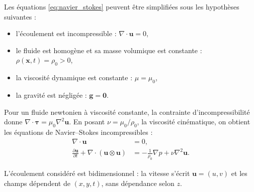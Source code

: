 Les équations \eqref{eq:navier_stokes} peuvent être simplifiées sous les
hypothèses suivantes :
\begin{itemize}
    \item l'écoulement est incompressible :
    $\nabla \cdot \mathbf{u} = 0$,

    \item le fluide est homogène et sa masse volumique est constante :
    $\rho(\mathbf{x}, t) = \rho_0 > 0$,

    \item la viscosité dynamique est constante : $\mu = \mu_0$,

    \item la gravité est négligée : $\mathbf{g} = \mathbf{0}$.
\end{itemize}
Pour un fluide newtonien à viscosité constante, la contrainte
d'incompressibilité donne
$\nabla \cdot \boldsymbol{\tau} = \mu_0 \nabla^2 \mathbf{u}$.
En posant $\nu = \mu_0 / \rho_0$, la viscosité cinématique,
on obtient les équations de Navier--Stokes incompressibles :
\begin{equation}
    \label{eq:navier_stokes_incompressible}
    \boxed{
    \begin{aligned}
        \nabla \cdot \mathbf{u} &= 0, \\
        \frac{\partial \mathbf{u}}{\partial t}
        + \nabla \cdot \left(\mathbf{u} \otimes \mathbf{u}\right)
        &= -\frac{1}{\rho_0}\nabla p + \nu \nabla^2 \mathbf{u}.
    \end{aligned}}
\end{equation}

L'écoulement considéré est bidimensionnel :
la vitesse s'écrit $\mathbf{u} = (u,v)$ et les champs
dépendent de $(x,y,t)$, sans dépendance selon $z$.

